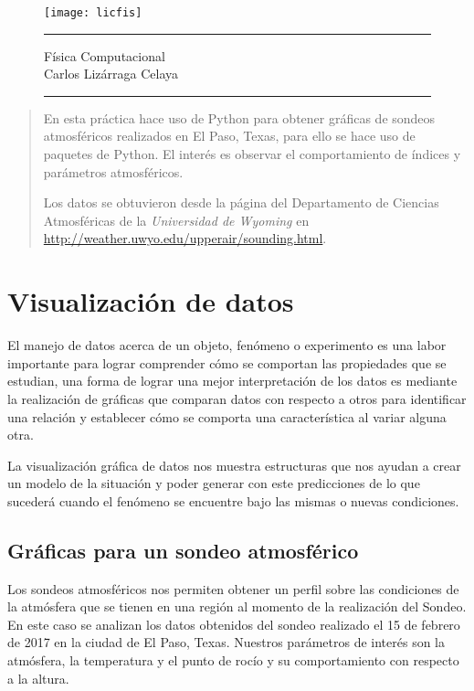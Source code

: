 

\begin{titlepage}%

\begin{figure}[h!]
    \centering
    \texttt{[image: licfis]}
    \\[2 cm]
    \hrule
    \maketitle
    {\Large Física Computacional\\Carlos Lizárraga Celaya}
    \bigskip
    \hrule
    \thispagestyle{empty}
\end{figure}
 \begin{abstract}
   \noindent En esta práctica hace uso de Python para obtener gráficas de sondeos atmosféricos realizados en El Paso, Texas, para ello se hace uso de paquetes de Python. El interés es observar el comportamiento de índices y parámetros atmosféricos.
   
   Los datos se obtuvieron desde la página del Departamento de Ciencias Atmosféricas de la \textit{Universidad de Wyoming} en \url{http://weather.uwyo.edu/upperair/sounding.html}.
    \end{abstract}
    \end{titlepage}
\newpage
\tableofcontents
\newpage

\section{Visualización de datos}
\noindent El manejo de datos acerca de un objeto, fenómeno o experimento es una labor importante para lograr comprender cómo se comportan las propiedades que se estudian, una forma de lograr una mejor interpretación de los datos es mediante la realización de gráficas que comparan datos con respecto a otros para identificar una relación y establecer cómo se comporta una característica al variar alguna otra.

La visualización gráfica de datos nos muestra estructuras que nos ayudan a crear un modelo de la situación y poder generar con este predicciones de lo que sucederá cuando el fenómeno se encuentre bajo las mismas o nuevas condiciones.

\subsection{Gráficas para un sondeo atmosférico}
Los sondeos atmosféricos nos permiten obtener un perfil sobre las condiciones de la atmósfera que se tienen en una región al momento de la realización del Sondeo. En este caso se analizan los datos obtenidos del sondeo realizado el 15 de febrero de 2017 en la ciudad de El Paso, Texas. Nuestros parámetros de interés son la atmósfera, la temperatura y el punto de rocío y su comportamiento con respecto a la altura.

